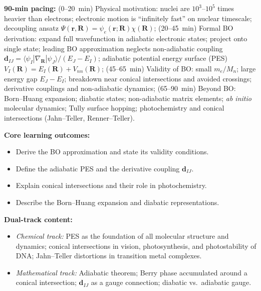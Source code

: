 \documentclass[11pt,a4paper]{article}
\begin{document}
\begin{tcolorbox}[chembox, title={Module~III.1 / L02: Born--Oppenheimer Approximation and Adiabaticity}]
\textbf{90-min pacing:} (0--20~min) Physical motivation: nuclei are $10^3$--$10^5$ times heavier than electrons; electronic motion is ``infinitely fast'' on nuclear timescale; decoupling ansatz $\Psi(\mathbf{r},\mathbf{R})=\psi_e(\mathbf{r};\mathbf{R})\chi(\mathbf{R})$; (20--45~min) Formal BO derivation: expand full wavefunction in adiabatic electronic states; project onto single state; leading BO approximation neglects non-adiabatic coupling $\mathbf{d}_{IJ}=\langle\psi_I|\nabla_\mathbf{R}|\psi_J\rangle/({E_J-E_I})$; adiabatic potential energy surface (PES) $V_I(\mathbf{R})=E_I(\mathbf{R})+V_{nn}(\mathbf{R})$; (45--65~min) Validity of BO: small $m_e/M_n$; large energy gap $E_J-E_I$; breakdown near conical intersections and avoided crossings; derivative couplings and non-adiabatic dynamics; (65--90~min) Beyond BO: Born--Huang expansion; diabatic states; non-adiabatic matrix elements; \emph{ab initio} molecular dynamics; Tully surface hopping; photochemistry and conical intersections (Jahn--Teller, Renner--Teller).

\medskip\textbf{Core learning outcomes:}
\begin{itemize}[leftmargin=1.4em,topsep=2pt,itemsep=1pt]
  \item Derive the BO approximation and state its validity conditions.
  \item Define the adiabatic PES and the derivative coupling $\mathbf{d}_{IJ}$.
  \item Explain conical intersections and their role in photochemistry.
  \item Describe the Born--Huang expansion and diabatic representations.
\end{itemize}

\medskip\textbf{Dual-track content:}
\begin{itemize}[leftmargin=1.4em,topsep=2pt,itemsep=1pt]
  \item \textit{Chemical track:} PES as the foundation of all molecular structure and dynamics; conical intersections in vision, photosynthesis, and photostability of DNA; Jahn--Teller distortions in transition metal complexes.
  \item \textit{Mathematical track:} Adiabatic theorem; Berry phase accumulated around a conical intersection; $\mathbf{d}_{IJ}$ as a gauge connection; diabatic vs.\ adiabatic gauge.
\end{itemize}


\end{tcolorbox}
\end{document}
